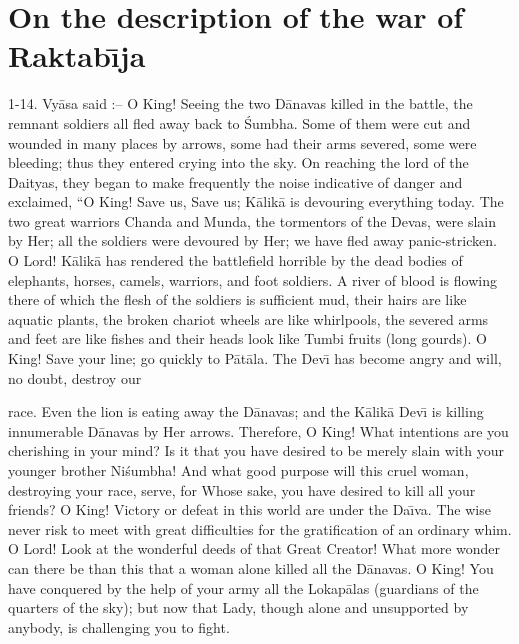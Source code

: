 \chapter{On the description of the war of Raktab\={\i}ja}

1-14. Vy\=asa said :-- O King! Seeing the two D\=anavas killed in the battle, the remnant soldiers all fled away back to \'Sumbha. Some of them were cut and wounded in many places by arrows, some had their arms severed, some were bleeding; thus they entered crying into the sky. On reaching the lord of the Daityas, they began to make frequently the noise indicative of danger and exclaimed, ``O King! Save us, Save us; K\=alik\=a is devouring everything today. The two great warriors Chanda and Munda, the tormentors of the Devas, were slain by Her; all the soldiers were devoured by Her; we have fled away panic-stricken. O Lord! K\=alik\=a has rendered the battlefield horrible by the dead bodies of elephants, horses, camels, warriors, and foot soldiers. A river of blood is flowing there of which the flesh of the soldiers is sufficient mud, their hairs are like aquatic plants, the broken chariot wheels are like whirlpools, the severed arms and feet are like fishes and their heads look like Tumbi fruits (long gourds). O King! Save your line; go quickly to P\=at\=ala. The Dev\={\i} has become angry and will, no doubt, destroy our

race. Even the lion is eating away the D\=anavas; and the K\=alik\=a Dev\={\i} is killing innumerable D\=anavas by Her arrows. Therefore, O King! What intentions are you cherishing in your mind? Is it that you have desired to be merely slain with your younger brother Ni\'sumbha! And what good purpose will this cruel woman, destroying your race, serve, for Whose sake, you have desired to kill all your friends? O King! Victory or defeat in this world are under the Da\={\i}va. The wise never risk to meet with great difficulties for the gratification of an ordinary whim. O Lord! Look at the wonderful deeds of that Great Creator! What more wonder can there be than this that a woman alone killed all the D\=anavas. O King! You have conquered by the help of your army all the Lokap\=alas (guardians of the quarters of the sky); but now that Lady, though alone and unsupported by anybody, is challenging you to fight.

